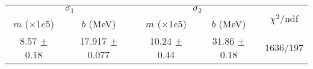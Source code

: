\begin{tabular}{cc|cc||c}
\multicolumn{2}{c|}{$\sigma_1$} & \multicolumn{2}{|c}{$\sigma_2$}   & \multirow{2}{*}{$\chi^2/$ndf}\\
$m$ ($\times1e5$) & $b$ (MeV) & $m$ ($\times1e5$) & $b$ (MeV)  & \\
\hline
8.57 $\pm$ 0.18 & 17.917 $\pm$ 0.077 & 10.24 $\pm$ 0.44 & 31.86 $\pm$ 0.18 & 1636/197\\
\end{tabular}
